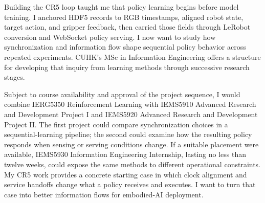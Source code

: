 Building the CR5 loop taught me that policy learning begins before model training. I anchored HDF5 records to RGB timestamps, aligned robot state, target action, and gripper feedback, then carried those fields through LeRobot conversion and WebSocket policy serving. I now want to study how synchronization and information flow shape sequential policy behavior across repeated experiments. CUHK's MSc in Information Engineering offers a structure for developing that inquiry from learning methods through successive research stages.

Subject to course availability and approval of the project sequence, I would combine IERG5350 Reinforcement Learning with IEMS5910 Advanced Research and Development Project I and IEMS5920 Advanced Research and Development Project II. The first project could compare synchronization choices in a sequential-learning pipeline; the second could examine how the resulting policy responds when sensing or serving conditions change. If a suitable placement were available, IEMS5930 Information Engineering Internship, lasting no less than twelve weeks, could expose the same methods to different operational constraints. My CR5 work provides a concrete starting case in which clock alignment and service handoffs change what a policy receives and executes. I want to turn that case into better information flows for embodied-AI deployment.
